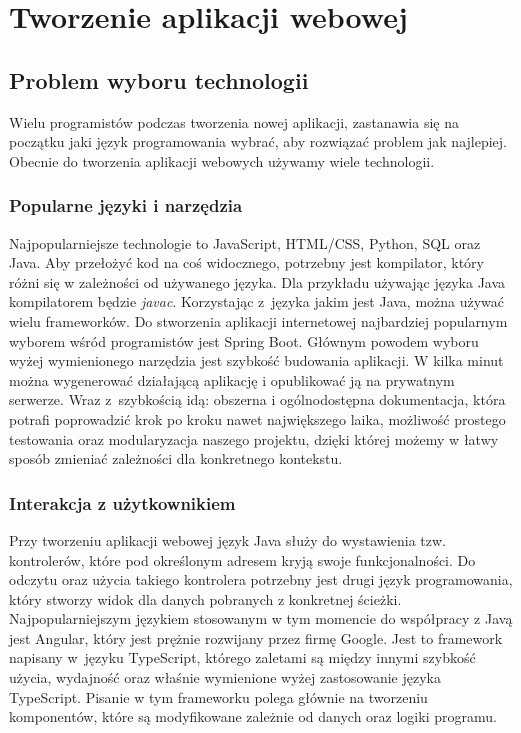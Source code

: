 \chapter{Tworzenie aplikacji webowej}

\section{Problem wyboru technologii}

Wielu programistów podczas tworzenia nowej aplikacji, zastanawia się na początku jaki język programowania wybrać, aby rozwiązać problem jak najlepiej. Obecnie do tworzenia aplikacji webowych używamy wiele technologii.

\subsection{Popularne języki i narzędzia}

Najpopularniejsze technologie to JavaScript, HTML/CSS, Python, SQL oraz Java. Aby przełożyć kod na coś widocznego, potrzebny jest kompilator, który różni się w zależności od używanego języka. Dla przykładu używając języka Java kompilatorem będzie \textit{javac}. Korzystając z~języka jakim jest Java, można używać wielu frameworków. Do stworzenia aplikacji internetowej najbardziej popularnym wyborem wśród programistów jest Spring Boot. Głównym powodem wyboru wyżej wymienionego narzędzia jest szybkość budowania aplikacji. W kilka minut można wygenerować działającą aplikację i opublikować ją na prywatnym serwerze. Wraz z~szybkością idą: obszerna i ogólnodostępna dokumentacja, która potrafi poprowadzić krok po kroku nawet największego laika, możliwość prostego testowania oraz modularyzacja naszego projektu, dzięki której możemy w łatwy sposób zmieniać zależności dla konkretnego kontekstu.

\subsection{Interakcja z użytkownikiem}

Przy tworzeniu aplikacji webowej język Java służy do wystawienia tzw. kontrolerów, które pod określonym adresem kryją swoje funkcjonalności. Do odczytu oraz użycia takiego kontrolera potrzebny jest drugi język programowania, który stworzy widok dla danych pobranych z konkretnej ścieżki. Najpopularniejszym językiem stosowanym w tym momencie do współpracy z Javą jest Angular, który jest prężnie rozwijany przez firmę Google. Jest to framework napisany w~języku TypeScript, którego zaletami są między innymi szybkość użycia, wydajność oraz właśnie wymienione wyżej zastosowanie języka TypeScript. Pisanie w tym frameworku polega głównie na tworzeniu komponentów, które są modyfikowane zależnie od danych oraz logiki programu.

